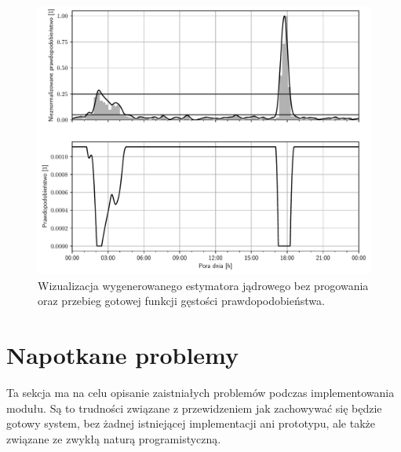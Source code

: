 \begin{figure}
    \centering\includegraphics[width=1.00\textwidth]{img/transformation.pdf}
    \caption{Wizualizacja wygenerowanego estymatora jądrowego bez progowania oraz przebieg gotowej funkcji gęstości prawdopodobieństwa.} \label{fig:transform}
\end{figure}

\section{Napotkane problemy}
Ta sekcja ma na celu opisanie zaistniałych problemów podczas implementowania modułu. Są to trudności związane z przewidzeniem jak zachowywać się będzie gotowy system, bez żadnej istniejącej implementacji ani prototypu, ale także związane ze zwykłą naturą programistyczną.

